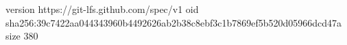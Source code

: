 version https://git-lfs.github.com/spec/v1
oid sha256:39c7422aa044343960b4492626ab2b38c8ebf3c1b7869ef5b520d05966dcd47a
size 380
